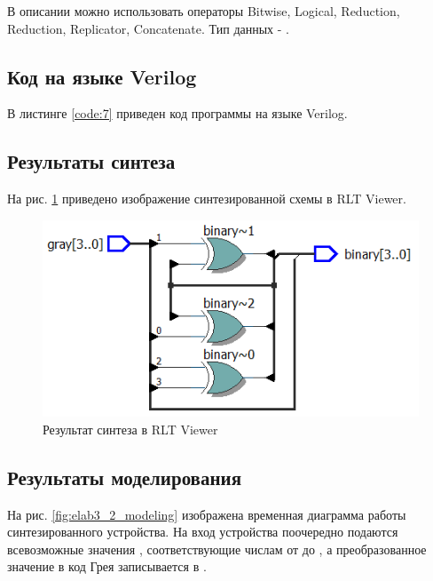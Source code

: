 В описании можно использовать операторы Bitwise, Logical, Reduction, Reduction, Replicator, Concatenate. Тип данных - .

\subsection{Код на языке Verilog}

В листинге \ref{code:7} приведен код программы на языке Verilog.



\subsection{Результаты синтеза}

На рис. \ref{fig:elab3_2_rtl} приведено изображение синтезированной схемы в RLT Viewer.

\begin{figure}[H]
\begin{center}
	\includegraphics[scale=0.9]{elab3_2_rtl}
	\caption{Результат синтеза в RLT Viewer}
	\label{fig:elab3_2_rtl}
\end{center}
\end{figure}

\subsection{Результаты моделирования}
\label{sec:elab3_2_modeling}

На рис. \ref{fig:elab3_2_modeling} изображена временная диаграмма работы синтезированного устройства. На вход устройства поочередно подаются всевозможные значения , соответствующие числам от  до , а преобразованное значение в код Грея записывается в .

